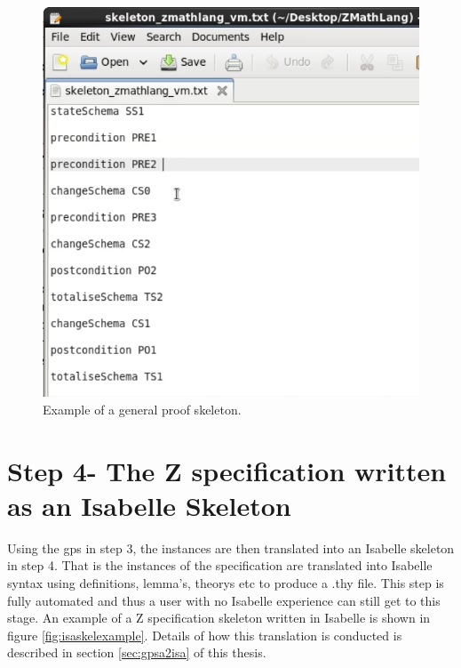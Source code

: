 \begin{figure}[H]
 \begin{center}
 \includegraphics [scale=0.2]{Figures/Design/proofskel.png}
 \caption{Example of a general proof skeleton.}
 \label{fig:proofskelexample}
\end{center}
\end{figure} 

\section{Step 4- The Z specification written as an Isabelle Skeleton}

Using the \gls{gps} in step 3, the instances are then translated into an Isabelle skeleton in step 4. That is the instances of the specification are translated into Isabelle syntax using definitions, lemma's, theorys etc to produce a .thy file. This step is fully automated and thus a user with no Isabelle experience can still get to this stage. An example of a Z specification skeleton written in Isabelle is shown in figure \ref{fig:isaskelexample}. Details of how this translation is conducted is described in section \ref{sec:gpsa2isa} of this thesis.


